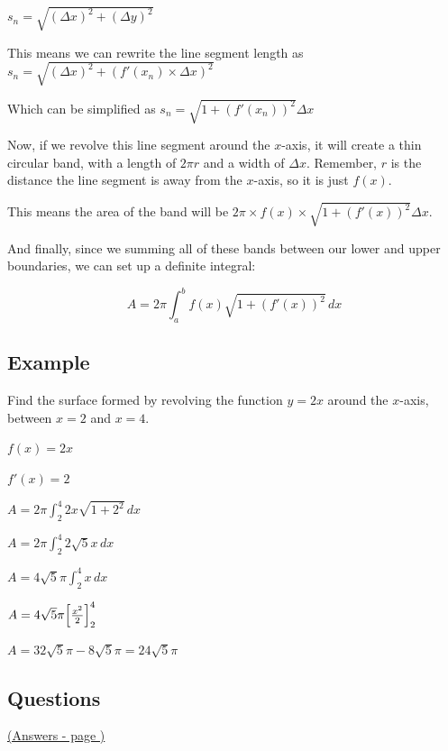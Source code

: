 \documentclass[../main.tex]{subfiles}
\begin{document}
$s_n=\sqrt{(\Delta x)^2+(\Delta y)^2}$

This means we can rewrite the line segment length as $s_n=\sqrt{(\Delta x)^2+(f'(x_n)\times \Delta x)^2}$

Which can be simplified as $s_n=\sqrt{1+(f'(x_n))^2}\Delta x$

Now, if we revolve this line segment around the $x$-axis, it will create a thin circular band, with a length of $2\pi r$ and a width of $\Delta x$. Remember, $r$ is the distance the line segment is away from the $x$-axis, so it is just $f(x)$.

This means the area of the band will be $2\pi \times f(x) \times \sqrt{1+(f'(x))^2}\Delta x$.

And finally, since we summing all of these bands between our lower and upper boundaries, we can set up a definite integral:

\[A=2\pi \int_a^b f(x)\sqrt{1+(f'(x))^2}\, dx\]
\pagebreak
\subsection*{Example}
Find the surface formed by revolving the function $y=2x$ around the $x$-axis, between $x=2$ and $x=4$.

$f(x)=2x$

$f'(x)=2$

$A=2\pi \int_2^4 2x\sqrt{1+2^2}\,dx$

$A=2\pi \int_2^4 2\sqrt{5}x\,dx$

$A=4\sqrt{5}\pi\int_2^4 x\,dx$

$A=4\sqrt{5}\pi\Bigl[\frac{x^2}{2}\Bigr]_2^4$

$A=32\sqrt{5}\pi - 8\sqrt{5}\pi=24\sqrt{5}\pi$
\pagebreak
\hypertarget{surfaceofrevolutionlink}{\subsection*{Questions}}
\hyperlink{surfaceofrevolutionanswers}{(Answers - page {\pageref*{Surface of revolution answers}})}

\label{Surface of revolution}
\end{document}
